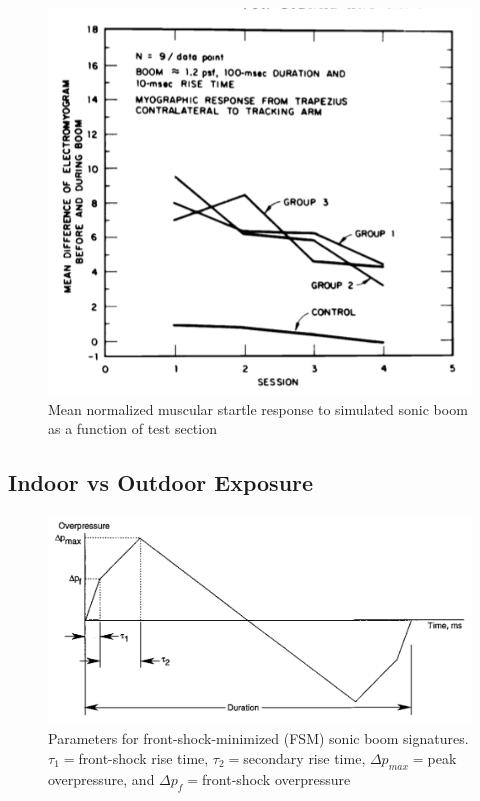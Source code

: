 \documentclass[]{aiaa-tc}%
\begin{document}
\begin{figure}[tb!]
  \centering
  \includegraphics[width=\textwidth]{figs/startle.png}
  \caption{Mean normalized muscular startle response to simulated sonic boom as a function of test section~\cite{sixsubjects}}
  \label{fig:startle}
\end{figure}

\subsection{Indoor vs Outdoor Exposure}

\begin{figure}[tb!]
  \centering
  \includegraphics[width=\textwidth]{figs/fsm.png}
  \caption{Parameters for front-shock-minimized (FSM) sonic boom signatures. $\tau_1=$front-shock rise time, $\tau_2=$secondary rise time, $\Delta p_{max}=$peak overpressure, and $\Delta p_f=$front-shock overpressure~\cite{leatherwood2002summary}}
  \label{fig:fsm}
\end{figure}
\end{document}
